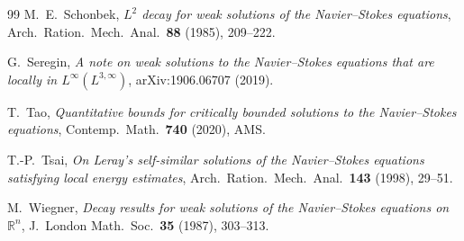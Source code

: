 \documentclass[11pt]{amsart}
\theoremstyle{definition}
\newcommand{\RR}{\mathbb{R}}
\begin{document}
\begin{thebibliography}{99}
M.~E.~Schonbek,
\emph{$L^2$ decay for weak solutions of the Navier--Stokes equations},
Arch.\ Ration.\ Mech.\ Anal.\ \textbf{88} (1985), 209--222.

G.~Seregin,
\emph{A note on weak solutions to the Navier--Stokes equations that are locally in $L^\infty(L^{3,\infty})$},
arXiv:1906.06707 (2019).

T.~Tao,
\emph{Quantitative bounds for critically bounded solutions to the Navier--Stokes equations},
Contemp.\ Math.\ \textbf{740} (2020), AMS.

T.-P.~Tsai,
\emph{On Leray's self-similar solutions of the Navier--Stokes equations satisfying local energy estimates},
Arch.\ Ration.\ Mech.\ Anal.\ \textbf{143} (1998), 29--51.

M.~Wiegner,
\emph{Decay results for weak solutions of the Navier--Stokes equations on $\RR^n$},
J.~London Math.\ Soc.\ \textbf{35} (1987), 303--313.

\end{thebibliography}
\end{document}
